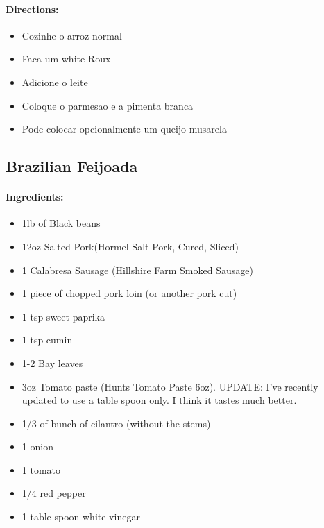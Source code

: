 \documentclass{article}
\begin{document}
\paragraph{Directions:}
\begin{itemize}
	\item Cozinhe o arroz normal
	\item Faca um white Roux
	\item Adicione o leite
	\item Coloque o parmesao e a pimenta branca
	\item Pode colocar opcionalmente um queijo musarela
\end{itemize} 

\subsection{Brazilian Feijoada}

\paragraph{Ingredients:}

\begin{itemize}
	\item 1lb of Black beans 
	\item 12oz Salted Pork(Hormel Salt Pork, Cured, Sliced)
	\item 1 Calabresa Sausage (Hillshire Farm Smoked Sausage)
	\item 1 piece of chopped pork loin (or another pork cut)
	\item 1 tsp sweet paprika
	\item 1 tsp cumin
	\item 1-2 Bay leaves 
	\item 3oz Tomato paste (Hunts Tomato Paste 6oz). UPDATE: I've recently updated to use a table spoon only.  I think it tastes much better.
	\item 1/3 of bunch of cilantro (without the stems)
	\item 1 onion 
	\item 1 tomato 
	\item 1/4 red pepper 
	\item 1 table spoon white vinegar
\end{itemize}
\end{document}
